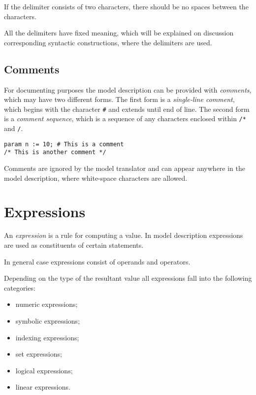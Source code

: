 \documentclass[11pt]{report}
\def\para#1{\noindent{\bf#1}}
\begin{document}
If the delimiter consists of two characters, there should be no spaces
between the characters.

All the delimiters have fixed meaning, which will be explained on
discussion corresponding syntactic constructions, where the delimiters
are used.

\section{Comments}

For documenting purposes the model description can be provided with
{\it comments}, which may have two different forms. The first form is
a {\it single-line comment}, which begins with the character {\tt\#}
and extends until end of line. The second form is a {\it comment
sequence}, which is a sequence of any characters enclosed within
{\tt/*} and {\tt*/}.

\para{Examples}

\begin{verbatim}
param n := 10; # This is a comment
/* This is another comment */
\end{verbatim}

Comments are ignored by the model translator and can appear anywhere in
the model description, where white-space characters are allowed.


\newpage

\chapter{Expressions}

An {\it expression} is a rule for computing a value. In model
description expressions are used as constituents of certain statements.

In general case expressions consist of operands and operators.

Depending on the type of the resultant value all expressions fall into
the following categories:

\vspace*{-8pt}

\begin{itemize}
\item numeric expressions;
\item symbolic expressions;
\item indexing expressions;
\item set expressions;
\item logical expressions;
\item linear expressions.
\end{itemize}
\end{document}
